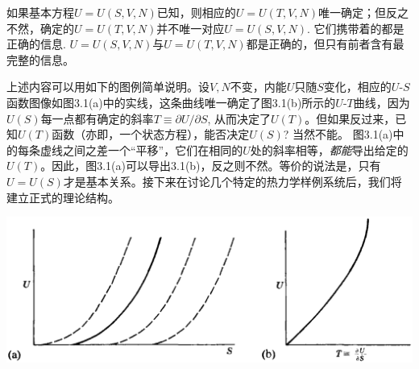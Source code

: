 如果基本方程$U = U(S, V, N)$已知，则相应的$U = U(T, V, N)$唯一确定；但反之不然，确定的$U = U(T, V, N)$并不唯一对应$U = U(S, V, N)$. 它们携带着的都是正确的信息. $U = U(S, V, N)$与$U = U(T, V, N)$都是正确的，但只有前者含有最完整的信息。  

上述内容可以用如下的图例简单说明。设$V, N$不变，内能$U$只随$S$变化，相应的$U\text{-}S$函数图像如图3.1(a)中的实线，这条曲线唯一确定了图3.1(b)所示的$U\text{-}T$曲线，因为$U(S)$每一点都有确定的斜率$T \equiv \partial U / \partial S$, 从而决定了$U(T)$。但如果反过来，已知$U(T)$函数（亦即，一个状态方程），能否决定$U(S)$? 当然不能。 图3.1(a)中的每条虚线之间之差一个“平移”，它们在相同的$U$处的斜率相等，{\it 都能}导出给定的$U(T)$。因此，图3.1(a)可以导出3.1(b)，反之则不然。等价的说法是，只有$U = U(S)$才是基本关系。接下来在讨论几个特定的热力学样例系统后，我们将建立正式的理论结构。

{
	\includegraphics[scale=0.25]{fig3_1.eps} 
	\figcaption{ }
}

